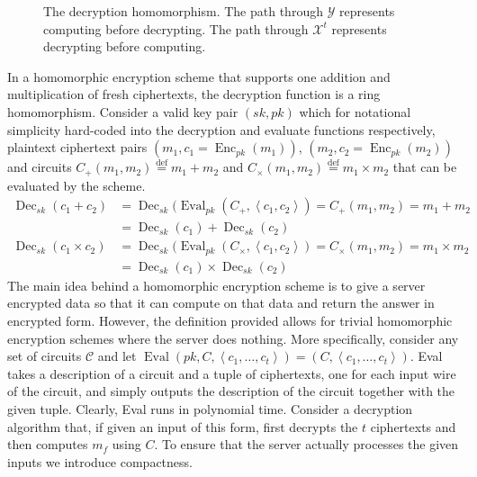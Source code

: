 \begin{figure}
    
    \caption{The decryption homomorphism. The path through $\mathcal{Y}$ represents computing before decrypting. The path through $\mathcal{X}^t$ represents decrypting before computing.}
    \label{fig:homomorphism}
\end{figure}

In a homomorphic encryption scheme that supports one addition and multiplication of fresh ciphertexts, the decryption function is a ring homomorphism. Consider a valid key pair $(sk,pk)$ which for notational simplicity hard-coded into the decryption and evaluate functions respectively, plaintext ciphertext pairs $(m_1,c_1 = \operatorname{Enc}_{pk}(m_1))$, $(m_2, c_2 = \operatorname{Enc}_{pk}(m_2))$ and circuits $C_+(m_1,m_2) \stackrel{\mathrm{def}}{=} m_1 + m_2$ and $C_{\times}(m_1,m_2) \stackrel{\mathrm{def}}{=} m_1 \times m_2$ that can be evaluated by the scheme. 
\begin{equation*}
\begin{aligned}
\operatorname{Dec}_{sk}(c_1 + c_2) &= \operatorname{Dec}_{sk}(\operatorname{Eval}_{pk}(C_+,\left\langle c_1,c_2 \right \rangle) = C_+(m_1,m_2) = m_1 + m_2 \\
    & = \operatorname{Dec}_{sk}(c_1) + \operatorname{Dec}_{sk}(c_2)\\
\operatorname{Dec}_{sk}(c_1 \times c_2) &= \operatorname{Dec}_{sk}(\operatorname{Eval}_{pk}(C_{\times},\left\langle c_1,c_2 \right \rangle) = C_{\times}(m_1,m_2) = m_1 \times m_2 \\
    & = \operatorname{Dec}_{sk}(c_1) \times \operatorname{Dec}_{sk}(c_2)
\end{aligned}
\end{equation*}
The main idea behind a homomorphic encryption scheme is to give a server encrypted data so that it can compute on that data and return the answer in encrypted form. However, the definition provided allows for trivial homomorphic encryption schemes where the server does nothing. More specifically, consider any set of circuits $\mathcal{C}$ and let $\operatorname{Eval}(pk, C,\left\langle c_1, \dots ,c_t \right\rangle) = (C, \left\langle c_1, \dots, c_t \right \rangle)$. Eval takes a description of a circuit and a tuple of ciphertexts, one for each input wire of the circuit, and simply outputs the description of the circuit together with the given tuple. Clearly, Eval runs in polynomial time. Consider a decryption algorithm that, if given an input of this form, first decrypts the $t$ ciphertexts and then computes $m_f$ using $C$. To ensure that the server actually processes the given inputs we introduce compactness.

